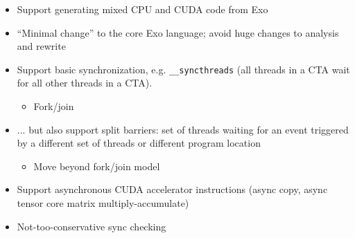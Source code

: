 \begin{minipage}[t]{0.48\textwidth}\fixminipage
{}  %

\begin{itemize}
\item Support generating mixed CPU and CUDA code from Exo
\item ``Minimal change'' to the core Exo language; avoid huge changes to analysis and rewrite
\item Support basic synchronization, e.g. \texttt{\_\_syncthreads} (all threads in a CTA wait for all other threads in a CTA).
\begin{itemize}
  \item Fork/join
\end{itemize}
\item ... but also support split barriers: set of threads waiting for an event triggered by a different set of threads or different program location
\begin{itemize}
  \item Move beyond fork/join model
\end{itemize}
\item Support asynchronous CUDA accelerator instructions (async copy, async tensor core matrix multiply-accumulate)
\item Not-too-conservative sync checking
\end{itemize}
\end{minipage} %
\hfill
